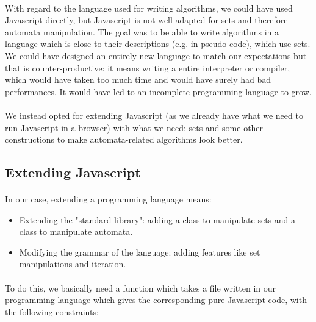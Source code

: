 \documentclass{article}
\begin{document}
\begin{sloppypar}
      
\paragraph{}
With regard to the language used for writing algorithms, we could have used Javascript directly, but Javascript is not well adapted for sets and therefore automata manipulation. The goal was to be able to write algorithms in a language which is close to their descriptions (e.g. in pseudo code), which use sets. We could have designed an entirely new language to match our expectations but that is counter-productive: it means writing a entire interpreter or compiler, which would have taken too much time and would have surely had bad performances. It would have led to an incomplete programming language to grow.
      
      
\paragraph{}
We instead opted for extending Javascript (as we already have what we need to run Javascript in a browser) with what we need: sets and some other constructions to make automata-related algorithms look better.
   
   
   

\subsection{ Extending Javascript}


\paragraph{}
In our case, extending a programming language means:
       
\begin{itemize}
	\item{ Extending the "standard library": adding a class to manipulate sets and a class to manipulate automata.}
	\item{ Modifying the grammar of the language: adding features like set manipulations and iteration.}
\end{itemize}

\paragraph{}
To do this, we basically need a function which takes a file written in our programming language which gives the corresponding pure Javascript code, with the following constraints:
       

\end{sloppypar}
\end{document}
